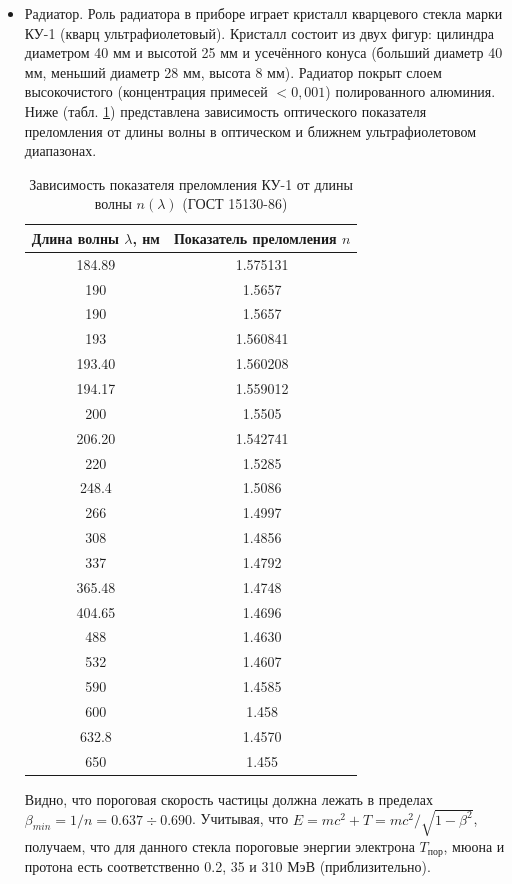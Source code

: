 \documentclass[12pt,a4paper]{report} %
\begin{document}
\begin{itemize}
	\item Радиатор. Роль радиатора в приборе играет кристалл кварцевого стекла марки КУ-1 (кварц ультрафиолетовый). Кристалл состоит из двух фигур: цилиндра диаметром 40 мм и высотой 25 мм и усечённого конуса (больший диаметр 40 мм, меньший диаметр 28 мм, высота 8 мм). Радиатор покрыт слоем высокочистого (концентрация примесей $<0,001$) полированного алюминия. Ниже (табл. \ref{tab:optical}) представлена зависимость оптического показателя преломления от длины волны в оптическом и ближнем ультрафиолетовом диапазонах. 
\begin{table}[bh]
		\caption{\label{tab:optical}Зависимость показателя преломления КУ-1 от длины волны $n(\lambda)$ (ГОСТ 15130-86)}
		\begin{center}
		\begin{tabular}{|c|c|}
		\hline
		Длина волны $\lambda$, нм & Показатель преломления $n$ \\
		\hline
		184.89&1.575131 \\
		190&1.5657 \\
		190 &1.5657 \\
		193&1.560841\\
		193.40&1.560208\\
		194.17&1.559012\\
		200&1.5505\\
		206.20&1.542741\\
		220&1.5285\\
		248.4&1.5086\\
		266&1.4997\\
		308&1.4856\\
		337&1.4792\\
		365.48&1.4748\\
		404.65&1.4696\\
		488&1.4630\\
		532&1.4607\\
		590&1.4585\\
		600&1.458\\
		632.8&1.4570\\
		650&1.455\\
		\hline
		\end{tabular}
		\end{center}
	\end{table} 
Видно, что пороговая скорость частицы должна лежать в пределах $\beta_{min}= 1/n = 0.637 \div 0.690$. Учитывая, что $E=mc^2+T = mc^2/\sqrt{1-\beta^2}$, получаем, что для данного стекла пороговые энергии электрона $T_{пор}$, мюона и протона есть соответственно 0.2, 35 и 310 МэВ (приблизительно).

\end{itemize}
\end{document}
